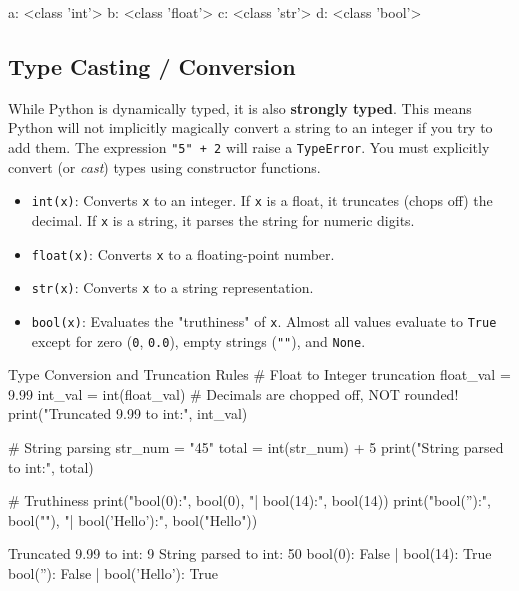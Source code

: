 \begin{outputbox}
a: <class 'int'>
b: <class 'float'>
c: <class 'str'>
d: <class 'bool'>
\end{outputbox}

\subsection{Type Casting / Conversion}

While Python is dynamically typed, it is also \textbf{strongly typed}. This means Python will not implicitly magically convert a string to an integer if you try to add them. The expression \texttt{"5" + 2} will raise a \texttt{TypeError}. You must explicitly convert (or \textit{cast}) types using constructor functions.

\begin{itemize}[leftmargin=1.5em]
    \item \texttt{int(x)}: Converts \texttt{x} to an integer. If \texttt{x} is a float, it truncates (chops off) the decimal. If \texttt{x} is a string, it parses the string for numeric digits.
    \item \texttt{float(x)}: Converts \texttt{x} to a floating-point number.
    \item \texttt{str(x)}: Converts \texttt{x} to a string representation.
    \item \texttt{bool(x)}: Evaluates the "truthiness" of \texttt{x}. Almost all values evaluate to \texttt{True} except for zero (\texttt{0}, \texttt{0.0}), empty strings (\texttt{""}), and \texttt{None}.
\end{itemize}

\begin{pythoncode}{Type Conversion and Truncation Rules}
# Float to Integer truncation
float_val = 9.99
int_val = int(float_val)  # Decimals are chopped off, NOT rounded!
print("Truncated 9.99 to int:", int_val)

# String parsing
str_num = "45"
total = int(str_num) + 5
print("String parsed to int:", total)

# Truthiness
print("bool(0):", bool(0), "| bool(14):", bool(14))
print("bool(''):", bool(""), "| bool('Hello'):", bool("Hello"))
\end{pythoncode}

\begin{outputbox}
Truncated 9.99 to int: 9
String parsed to int: 50
bool(0): False | bool(14): True
bool(''): False | bool('Hello'): True
\end{outputbox}

